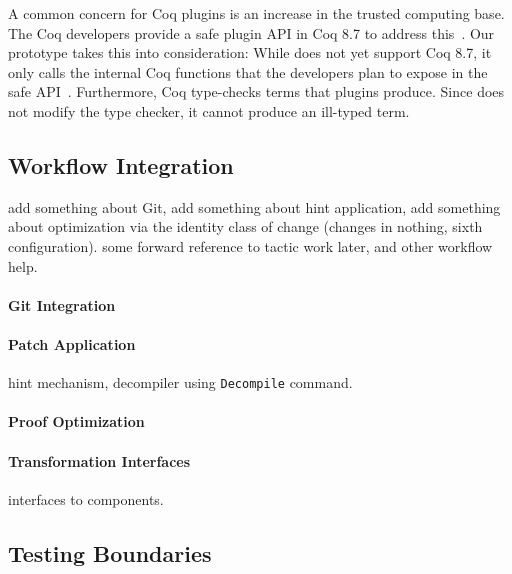 A common concern for Coq plugins is an increase in the trusted computing base.
The Coq developers provide a safe plugin API in Coq 8.7 to address this~\cite{coq87news}.
Our prototype takes this into consideration:
While \sysname does not yet support Coq 8.7, it only calls the internal Coq functions that the 
developers plan to expose in the safe API~\cite{coqPR}.
Furthermore, Coq type-checks terms that plugins produce.
Since \sysname does not modify the type checker, it cannot produce an ill-typed term.

\subsection{Workflow Integration}
\label{sec:workflow}

add something about Git, add something about hint application,
add something about optimization via the identity class of change (changes in nothing, sixth configuration).
some forward reference to tactic work later, and other workflow help.

\paragraph{Git Integration}

\paragraph{Patch Application}
hint mechanism, decompiler using \lstinline{Decompile} command.

\paragraph{Proof Optimization}

\paragraph{Transformation Interfaces} interfaces to components.

\subsection{Testing Boundaries}
\label{sec:eval}


